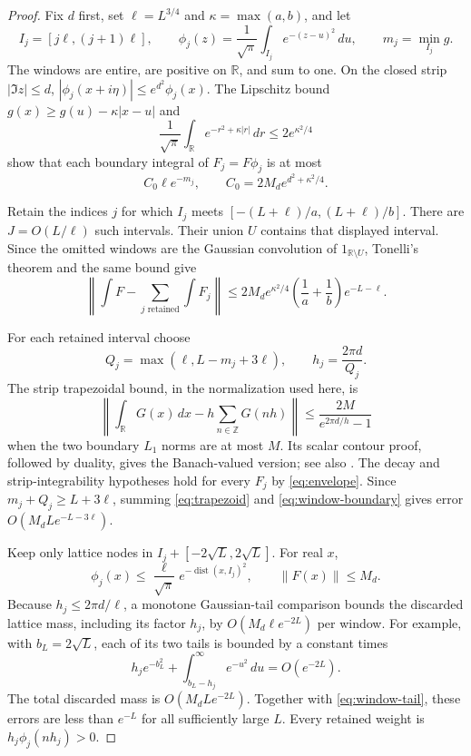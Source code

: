 \documentclass[11pt]{article}
\numberwithin{equation}{section}
\newcommand{\R}{\mathbb R}
\begin{document}
\begin{proof}
Fix $d$ first, set $\ell=L^{3/4}$ and $\kappa=\max(a,b)$, and let
\[
 I_j=[j\ell,(j+1)\ell],\qquad
 \phi_j(z)=\frac1{\sqrt\pi}\int_{I_j}e^{-(z-u)^2}\,du,
 \qquad m_j=\min_{I_j}g.
\]
The windows are entire, are positive on $\R$, and sum to one. On the
closed strip $|\Im z|\le d$,
$|\phi_j(x+i\eta)|\le e^{d^2}\phi_j(x)$.
The Lipschitz bound $g(x)\ge g(u)-\kappa|x-u|$ and
\[
 \frac1{\sqrt\pi}\int_\R e^{-r^2+\kappa|r|}\,dr
       \le2e^{\kappa^2/4}
\]
show that each boundary integral of $F_j=F\phi_j$ is at most
\begin{equation}\label{eq:window-boundary}
 C_0\ell e^{-m_j},\qquad
 C_0=2M_de^{d^2+\kappa^2/4}.
\end{equation}

Retain the indices $j$ for which $I_j$ meets
$[-(L+\ell)/a,(L+\ell)/b]$. There are $J=O(L/\ell)$ such intervals.
Their union $U$ contains that displayed interval. Since the omitted
windows are the Gaussian convolution of $1_{\R\setminus U}$, Tonelli's
theorem and the same bound give
\begin{equation}\label{eq:window-tail}
 \left\|\int F-\sum_{j\text{ retained}}\int F_j\right\|
 \le2M_de^{\kappa^2/4}\left(\frac1a+\frac1b\right)e^{-L-\ell}.
\end{equation}

For each retained interval choose
\[
 Q_j=\max(\ell,L-m_j+3\ell),\qquad h_j=\frac{2\pi d}{Q_j}.
\]
The strip trapezoidal bound, in the normalization used here, is
\begin{equation}\label{eq:trapezoid}
 \left\|\int_\R G(x)\,dx-h\sum_{n\in\mathbb Z}G(nh)\right\|
 \le\frac{2M}{e^{2\pi d/h}-1}
\end{equation}
when the two boundary $L_1$ norms are at most $M$. Its scalar contour
proof, followed by duality, gives the Banach-valued version; see also
\cite[Theorem~5.1]{TW}. The decay and strip-integrability hypotheses
hold for every $F_j$ by \eqref{eq:envelope}. Since
$m_j+Q_j\ge L+3\ell$, summing \eqref{eq:trapezoid} and
\eqref{eq:window-boundary} gives error $O(M_dL e^{-L-3\ell})$.

Keep only lattice nodes in $I_j+[-2\sqrt L,2\sqrt L]$.
For real $x$,
\[
 \phi_j(x)\le\frac{\ell}{\sqrt\pi}
       e^{-\operatorname{dist}(x,I_j)^2},\qquad \|F(x)\|\le M_d.
\]
Because $h_j\le2\pi d/\ell$, a monotone Gaussian-tail comparison
bounds the discarded lattice mass, including its factor $h_j$, by
$O(M_d\ell e^{-2L})$ per window. For example, with $b_L=2\sqrt L$,
each of its two tails is bounded by a constant times
\[
 h_j e^{-b_L^2}+\int_{b_L-h_j}^\infty e^{-u^2}\,du
       =O(e^{-2L}).
\]
The total discarded mass is $O(M_dL e^{-2L})$. Together with
\eqref{eq:window-tail}, these errors are less than $e^{-L}$ for all
sufficiently large $L$. Every retained weight is
$h_j\phi_j(nh_j)>0$.


\end{proof}
\end{document}
